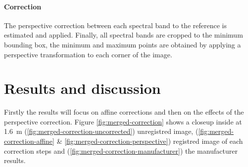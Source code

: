\documentclass[]{elsarticle}
\begin{document}
	\paragraph{Correction}
	
	The perspective correction between each spectral band to the reference is estimated and applied.
	Finally, all spectral bands are cropped to the minimum bounding box,
	the minimum and maximum points are obtained by applying a perspective transformation to each corner of the image.
	
	
	\section{Results and discussion}
	
	Firstly the results will focus on affine corrections and then on the effects of the perspective correction.
	Figure \ref{fig:merged-correction} shows a closeup inside at \SI{1.6}{\meter} (\ref{fig:merged-correction-uncorrected}) unregistred image,
	(\ref{fig:merged-correction-affine} \& \ref{fig:merged-correction-perspective}) registred image of each correction steps
	and (\ref{fig:merged-correction-manufacturer}) the manufacturer results.
	
\end{document}
